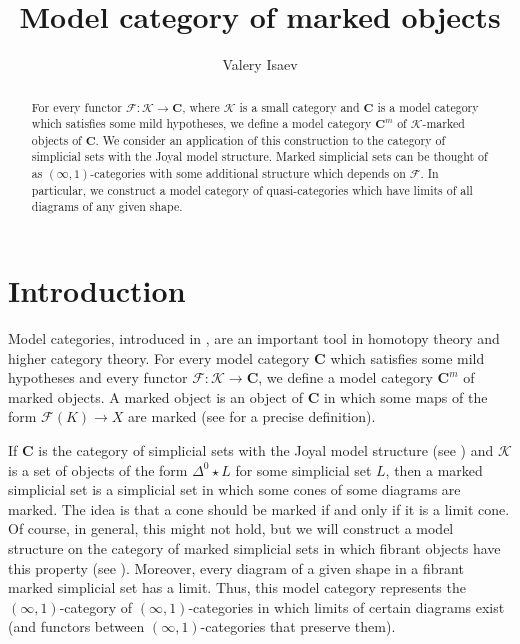 \documentclass[reqno]{amsart}
\theoremstyle{definition}
\theoremstyle{remark}
\newcommand{\cat}[1]{\mathbf{#1}}
\newcommand{\C}{\cat{C}}
\newcommand{\join}{\star}
\numberwithin{figure}{section}
\begin{document}
\title{Model category of marked objects}

\author{Valery Isaev}

\begin{abstract}
For every functor $\mathcal{F} : \mathcal{K} \to \mathbf{C}$, where $\mathcal{K}$ is a small category and $\mathbf{C}$ is a model category which satisfies some mild hypotheses,
we define a model category $\mathbf{C}^m$ of $\mathcal{K}$-marked objects of $\mathbf{C}$.
We consider an application of this construction to the category of simplicial sets with the Joyal model structure.
Marked simplicial sets can be thought of as $(\infty,1)$-categories with some additional structure which depends on $\mathcal{F}$.
In particular, we construct a model category of quasi-categories which have limits of all diagrams of any given shape.
\end{abstract}

\maketitle

\section{Introduction}

Model categories, introduced in \cite{quillen}, are an important tool in homotopy theory and higher category theory.
For every model category $\C$ which satisfies some mild hypotheses and every functor $\mathcal{F} : \mathcal{K} \to \C$, we define a model category $\C^m$ of marked objects.
A marked object is an object of $\C$ in which some maps of the form $\mathcal{F}(K) \to X$ are marked (see  for a precise definition).

If $\C$ is the category of simplicial sets with the Joyal model structure (see \cite{Joyal,lurie-topos})
and $\mathcal{K}$ is a set of objects of the form $\Delta^0 \join L$ for some simplicial set $L$,
then a marked simplicial set is a simplicial set in which some cones of some diagrams are marked.
The idea is that a cone should be marked if and only if it is a limit cone.
Of course, in general, this might not hold, but we will construct a model structure on the category of marked simplicial sets in which fibrant objects have this property (see ).
Moreover, every diagram of a given shape in a fibrant marked simplicial set has a limit.
Thus, this model category represents the $(\infty,1)$-category of $(\infty,1)$-categories in which limits of certain diagrams exist (and functors between $(\infty,1)$-categories that preserve them).
\end{document}
